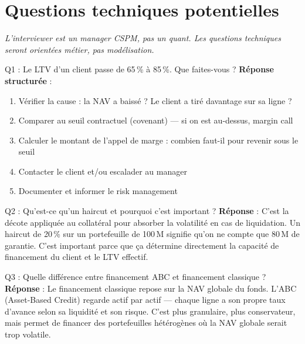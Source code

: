 \documentclass[11pt,a4paper]{article}
\begin{document}
\vspace{8pt}

\section{Questions techniques potentielles}

\textcolor{warmgray}{\textit{L'interviewer est un manager CSPM, pas un quant. Les questions
techniques seront orient\'ees m\'etier, pas mod\'elisation.}}

\vspace{6pt}

\begin{graybox}{Q1 : \og Le LTV d'un client passe de 65\,\% \`a 85\,\%. Que faites-vous ? \fg{}}
\textbf{R\'eponse structur\'ee} :
\begin{enumerate}[nosep, leftmargin=16pt]
\item V\'erifier la cause : la NAV a baiss\'e ? Le client a tir\'e davantage sur sa ligne ?
\item Comparer au seuil contractuel (covenant) --- si on est au-dessus, margin call
\item Calculer le montant de l'appel de marge : combien faut-il pour revenir sous le seuil
\item Contacter le client et/ou escalader au manager
\item Documenter et informer le risk management
\end{enumerate}
\end{graybox}

\vspace{4pt}

\begin{graybox}{Q2 : \og Qu'est-ce qu'un haircut et pourquoi c'est important ? \fg{}}
\textbf{R\'eponse} : C'est la d\'ecote appliqu\'ee au collat\'eral pour absorber la volatilit\'e
en cas de liquidation. Un haircut de 20\,\% sur un portefeuille de 100\,M\texteuro{} signifie
qu'on ne compte que 80\,M\texteuro{} de garantie. C'est important parce que \c{c}a d\'etermine
directement la capacit\'e de financement du client et le LTV effectif.
\end{graybox}

\vspace{4pt}

\begin{graybox}{Q3 : \og Quelle diff\'erence entre financement ABC et financement classique ? \fg{}}
\textbf{R\'eponse} : Le financement classique repose sur la NAV globale du fonds.
L'ABC (Asset-Based Credit) regarde actif par actif --- chaque ligne a son propre
taux d'avance selon sa liquidit\'e et son risque. C'est plus granulaire, plus
conservateur, mais permet de financer des portefeuilles h\'et\'erog\`enes o\`u la NAV
globale serait trop volatile.
\end{graybox}
\end{document}
